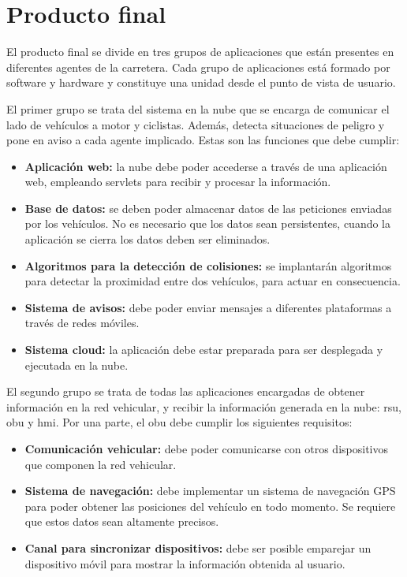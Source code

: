 \chapter{Producto final}
El producto final se divide en tres grupos de aplicaciones que están presentes en diferentes
agentes de la carretera. Cada grupo de aplicaciones está formado por software y hardware
y constituye una unidad desde el punto de vista de usuario.

El primer grupo se trata del sistema en la nube que se encarga de comunicar el lado de
vehículos a motor y ciclistas. Además, detecta situaciones de peligro y pone en aviso a
cada agente implicado. Estas son las funciones que debe cumplir:
\begin{itemize}
	\item \textbf{Aplicación web:} la nube debe poder accederse a través de una aplicación
	web, empleando servlets para recibir y procesar la información.
	
	\item \textbf{Base de datos:} se deben poder almacenar datos de las peticiones enviadas
	por los vehículos. No es necesario que los datos sean persistentes, cuando la aplicación
	se cierra los datos deben ser eliminados.
	
	\item \textbf{Algoritmos para la detección de colisiones:} se implantarán algoritmos para detectar
	la proximidad entre dos vehículos, para actuar en consecuencia.
	
	\item \textbf{Sistema de avisos:} debe poder enviar mensajes a diferentes plataformas a
	través de redes móviles.
	
	\item \textbf{Sistema cloud:} la aplicación debe estar preparada para ser desplegada y
	ejecutada en la nube.
\end{itemize}

El segundo grupo se trata de todas las aplicaciones encargadas de obtener información en la
red vehicular, y recibir la información generada en la nube: \gls{rsu}, \gls{obu} y \gls{hmi}. Por
una parte, el \gls{obu} debe cumplir los siguientes requisitos:
\begin{itemize}
	\item \textbf{Comunicación vehicular:} debe poder comunicarse con otros dispositivos que
	componen la red vehicular.
	
	\item \textbf{Sistema de navegación:} debe implementar un sistema de navegación GPS para
	poder obtener las posiciones del vehículo en todo momento. Se requiere que estos datos sean
	altamente precisos.
	
	\item \textbf{Canal para sincronizar dispositivos:} debe ser posible emparejar un dispositivo
	móvil para mostrar la información obtenida al usuario.
\end{itemize}

